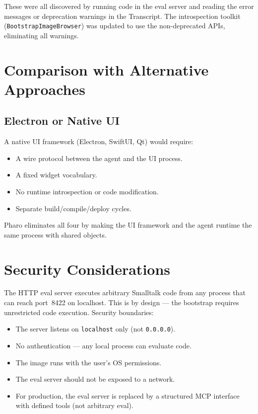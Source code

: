 \documentclass[a4paper,10pt,fleqn]{article}
\newcommand{\cls}[1]{\texttt{#1}}
\begin{document}
These were all discovered by running code in the eval server and
reading the error messages or deprecation warnings in the Transcript.
The introspection toolkit (\cls{BootstrapImageBrowser}) was updated to use
the non-deprecated APIs, eliminating all warnings.

\section{Comparison with Alternative Approaches}

\subsection{Electron or Native UI}

A native UI framework (Electron, SwiftUI, Qt) would require:
\begin{itemize}
  \item A wire protocol between the agent and the UI process.
  \item A fixed widget vocabulary.
  \item No runtime introspection or code modification.
  \item Separate build/compile/deploy cycles.
\end{itemize}

Pharo eliminates all four by making the UI framework and the agent
runtime the same process with shared objects.

\section{Security Considerations}

The HTTP eval server executes arbitrary Smalltalk code from any process
that can reach port~8422 on localhost.  This is by design --- the
bootstrap requires unrestricted code execution.  Security boundaries:

\begin{itemize}
  \item The server listens on \texttt{localhost} only (not
    \texttt{0.0.0.0}).
  \item No authentication --- any local process can evaluate code.
  \item The image runs with the user's OS permissions.
  \item The eval server should not be exposed to a network.
  \item For production, the eval server is replaced by a structured MCP
    interface with defined tools (not arbitrary eval).
\end{itemize}
\end{document}
